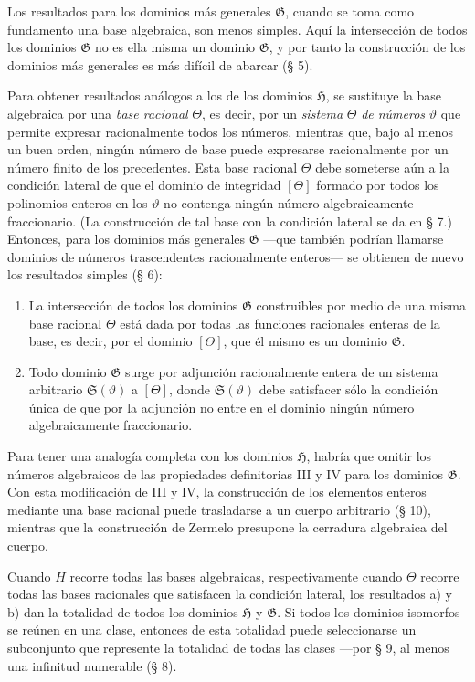 \documentclass[11pt]{article}
\begin{document}
Los resultados para los dominios más generales $\mathfrak G$, cuando se toma como fundamento una base algebraica, son menos simples. Aquí la intersección de todos los dominios $\mathfrak G$ no es ella misma un dominio $\mathfrak G$, y por tanto la construcción de los dominios más generales es más difícil de abarcar (§ 5).

Para obtener resultados análogos a los de los dominios $\mathfrak H$, se sustituye la base algebraica por una \emph{base racional} $\Theta$, es decir, por un \emph{sistema} $\Theta$ \emph{de números} $\vartheta$ que permite expresar racionalmente todos los números, mientras que, bajo al menos un buen orden, ningún número de base puede expresarse racionalmente por un número finito de los precedentes. Esta base racional $\Theta$ debe someterse aún a la condición lateral de que el dominio de integridad $[\Theta]$ formado por todos los polinomios enteros en los $\vartheta$ no contenga ningún número algebraicamente fraccionario. (La construcción de tal base con la condición lateral se da en § 7.) Entonces, para los dominios más generales $\mathfrak G$ ---que también podrían llamarse dominios de números trascendentes racionalmente enteros--- se obtienen de nuevo los resultados simples (§ 6):
\begin{enumerate}
\item[a)] La intersección de todos los dominios $\mathfrak G$ construibles por medio de una misma base racional $\Theta$ está dada por todas las funciones racionales enteras de la base, es decir, por el dominio $[\Theta]$, que él mismo es un dominio $\mathfrak G$.
\item[b)] Todo dominio $\mathfrak G$ surge por adjunción racionalmente entera de un sistema arbitrario $\mathfrak S(\vartheta)$ a $[\Theta]$, donde $\mathfrak S(\vartheta)$ debe satisfacer sólo la condición única de que por la adjunción no entre en el dominio ningún número algebraicamente fraccionario.
\end{enumerate}

Para tener una analogía completa con los dominios $\mathfrak H$, habría que omitir los números algebraicos de las propiedades definitorias III y IV para los dominios $\mathfrak G$. Con esta modificación de III y IV, la construcción de los elementos enteros mediante una base racional puede trasladarse a un cuerpo arbitrario (§ 10), mientras que la construcción de Zermelo presupone la cerradura algebraica del cuerpo.

Cuando $H$ recorre todas las bases algebraicas, respectivamente cuando $\Theta$ recorre todas las bases racionales que satisfacen la condición lateral, los resultados a) y b) dan la totalidad de todos los dominios $\mathfrak H$ y $\mathfrak G$. Si todos los dominios isomorfos se reúnen en una clase, entonces de esta totalidad puede seleccionarse un subconjunto que represente la totalidad de todas las clases ---por § 9, al menos una infinitud numerable (§ 8).
\end{document}
